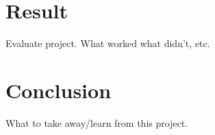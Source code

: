 \documentclass[12pt]{article}
\begin{document}
\section{Result}
Evaluate project. What worked what didn't, etc. 

\section{Conclusion}
What to take away/learn from this project.

\newpage
 

\listoffigures
\end{document}
